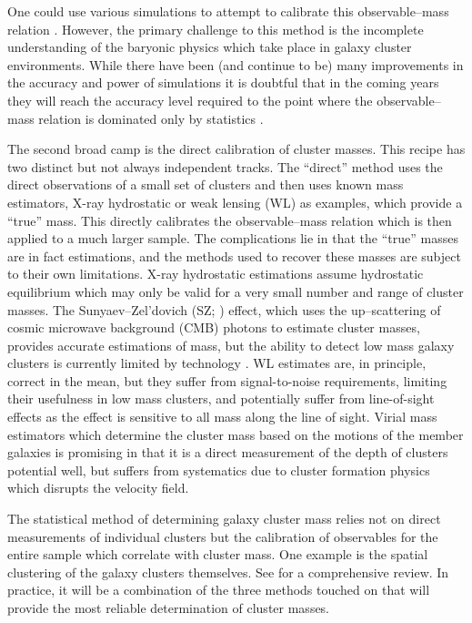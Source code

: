 One could use various simulations to attempt to calibrate this observable--mass relation . However, the primary challenge to this method is the incomplete understanding of the baryonic physics which take place in galaxy cluster environments. While there have been (and continue to be) many improvements in the accuracy and power of simulations it is doubtful that in the coming years they will reach the accuracy level required to the point where the observable--mass relation is dominated only by statistics \citep{Weinberg2013}. 
 
The second broad camp is the direct calibration of cluster masses. This recipe has two distinct but not always independent tracks. The ``direct'' method uses the direct observations of a small set of clusters and then uses known mass estimators, X-ray hydrostatic or weak lensing (WL) as examples, which provide a ``true'' mass. This directly calibrates the observable--mass relation which is then applied to a much larger sample. The complications lie in that the ``true'' masses are in fact estimations, and the methods used to recover these masses are subject to their own limitations. X-ray hydrostatic estimations assume hydrostatic equilibrium  which may only be valid for a very small number and range of cluster masses. The Sunyaev--Zel’dovich (SZ; \citealt{Sunyaev1972}) effect, which uses the up--scattering of cosmic microwave background (CMB) photons to estimate cluster masses, provides accurate estimations of mass, but the ability to detect low mass galaxy clusters is currently limited by technology . WL estimates are, in principle, correct in the mean, but they suffer from signal-to-noise requirements, limiting their usefulness in low mass clusters, and potentially suffer from line-of-sight effects as the effect is sensitive to all mass along the line of sight. Virial mass estimators which determine the cluster mass based on the motions of the member galaxies is promising in that it is a direct measurement of the depth of clusters potential well, but suffers from systematics due to cluster formation physics which disrupts the velocity field.
 
The statistical method of determining galaxy cluster mass relies not on direct measurements of individual clusters but the calibration of observables for the entire sample which correlate with cluster mass. One example is the spatial clustering of the galaxy clusters themselves. See \cite{Weinberg2013} for a comprehensive review. In practice, it will be a combination of the three methods touched on that will provide the most reliable determination of cluster masses. 

